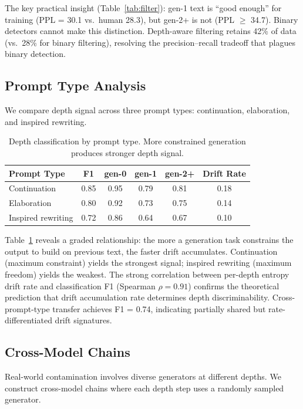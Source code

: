 \documentclass[letterpaper, 10pt]{article}
\begin{document}
The key practical insight (Table~\ref{tab:filter}): gen-1 text is ``good enough'' for training (PPL = 30.1 vs.\ human 28.3), but gen-2+ is not (PPL $\geq$ 34.7).
Binary detectors cannot make this distinction.
Depth-aware filtering retains 42\% of data (vs.\ 28\% for binary filtering), resolving the precision--recall tradeoff that plagues binary detection.

\subsection{Prompt Type Analysis}
\label{sec:prompt}

We compare depth signal across three prompt types: continuation, elaboration, and inspired rewriting.

\begin{table}[t]
\centering
\caption{Depth classification by prompt type. More constrained generation produces stronger depth signal.}
\label{tab:prompt}
\small
\begin{tabular}{@{}lccccc@{}}
\toprule
Prompt Type & F1 & gen-0 & gen-1 & gen-2+ & Drift Rate \\
\midrule
Continuation & 0.85 & 0.95 & 0.79 & 0.81 & 0.18 \\
Elaboration & 0.80 & 0.92 & 0.73 & 0.75 & 0.14 \\
Inspired rewriting & 0.72 & 0.86 & 0.64 & 0.67 & 0.10 \\
\bottomrule
\end{tabular}
\end{table}

Table~\ref{tab:prompt} reveals a graded relationship: the more a generation task constrains the output to build on previous text, the faster drift accumulates.
Continuation (maximum constraint) yields the strongest signal; inspired rewriting (maximum freedom) yields the weakest.
The strong correlation between per-depth entropy drift rate and classification F1 (Spearman $\rho = 0.91$) confirms the theoretical prediction that drift accumulation rate determines depth discriminability.
Cross-prompt-type transfer achieves F1 = 0.74, indicating partially shared but rate-differentiated drift signatures.

\subsection{Cross-Model Chains}

Real-world contamination involves diverse generators at different depths.
We construct cross-model chains where each depth step uses a randomly sampled generator.
\end{document}
